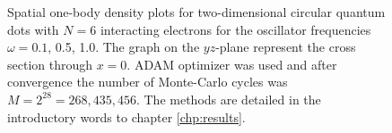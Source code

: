 \begin{landscape}
\begin{figure} [H]
		\caption{Spatial one-body density plots for two-dimensional circular quantum dots with $N=6$ interacting electrons for the oscillator frequencies $\omega=0.1$, 0.5, 1.0. The graph on the $yz$-plane represent the cross section through $x=0$. ADAM optimizer was used and after convergence the number of Monte-Carlo cycles was $M=2^{28}=268,435,456$. The methods are detailed in the introductory words to chapter \ref{chp:results}.}%
		\label{fig:OB2_interaction_6P}
	\end{figure}
	\begin{figure} [H]%
		\centering
		\captionsetup[subfigure]{labelformat=empty}
		\captionsetup{width=0.9\hsize}
		\hspace{0.1cm}
		\hspace{-0.0cm}
		\hspace{-0.0cm}
		\hspace{-0.0cm}
		\\ [-0.3cm]
		

\end{figure}
\end{landscape}
